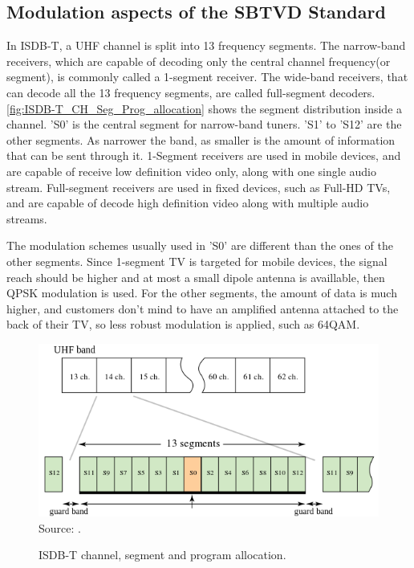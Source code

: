 \documentclass[
	12pt,				%
	openright,			%
	twoside,			%
	a4paper,			%
	brazil,
	french,				%
	english
	]{abntex2}
\begin{document}
\begin{apendicesenv}

\partapendices

\chapter{Modulation aspects of the SBTVD Standard}
\label{modulation}
In ISDB-T, a UHF channel is split into 13 frequency segments. The narrow-band receivers, which are capable of decoding only the central channel frequency(or segment), is commonly called a 1-segment receiver. The wide-band receivers, that can decode all the 13 frequency segments, are called full-segment decoders. \autoref{fig:ISDB-T_CH_Seg_Prog_allocation} shows the segment distribution inside a channel. 'S0' is the central segment for narrow-band tuners. 'S1' to 'S12' are the other segments. As narrower the band, as smaller is the amount of information that can be sent through it. 1-Segment receivers are used in mobile devices, and are capable of receive low definition video only, along with one single audio stream. Full-segment receivers are used in fixed devices, such as Full-HD TVs, and are capable of decode high definition video along with multiple audio streams.

The modulation schemes usually used in 'S0' are different than the ones of the other segments. Since 1-segment TV is targeted for mobile devices, the signal reach should be higher and at most a small dipole antenna is availlable, then QPSK modulation is used. For the other segments, the amount of data is much higher, and customers don't mind to have an amplified antenna attached to the back of their TV, so less robust modulation is applied, such as 64QAM. 

\begin{figure}
\centering
\caption{ISDB-T channel, segment and program allocation.}
\includegraphics[width=0.8\linewidth]{figuras/ISDB-T_CH_Seg_Prog_allocation.png}
\\Source: .
\label{fig:ISDB-T_CH_Seg_Prog_allocation}
\end{figure}


\end{apendicesenv}
\end{document}
